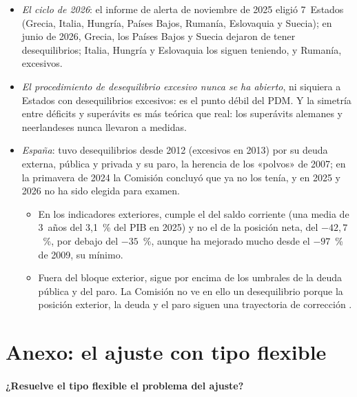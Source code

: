 \documentclass[11pt]{article}
\begin{document}
\begin{itemize}
\item \emph{El ciclo de 2026}: el informe de alerta de noviembre de 2025 eligió 7~Estados (Grecia, Italia, Hungría, Países Bajos, Rumanía, Eslovaquia y Suecia); en junio de 2026, Grecia, los Países Bajos y Suecia dejaron de tener desequilibrios; Italia, Hungría y Eslovaquia los siguen teniendo, y Rumanía, excesivos\nocite{CE2025AMR2026,CE2026PaquetePrimavera}.
\item \emph{El procedimiento de desequilibrio excesivo nunca se ha abierto}, ni siquiera a Estados con desequilibrios excesivos: es el punto débil del PDM. Y la simetría entre déficits y superávits es más teórica que real: los superávits alemanes y neerlandeses nunca llevaron a medidas.
\item \emph{España}: tuvo desequilibrios desde 2012 (excesivos en 2013) por su deuda externa, pública y privada y su paro, la herencia de los «polvos» de 2007; en la primavera de 2024 la Comisión concluyó que ya no los tenía, y en 2025 y 2026 no ha sido elegida para examen\nocite{CE2025PrimaveraPDM}.
  \begin{itemize}
  \item En los indicadores exteriores, cumple el del saldo corriente (una media de 3~años del 3,1~\% del PIB en 2025) y no el de la posición neta, del $-42{,}7$~\%, por debajo del $-35$~\%, aunque ha mejorado mucho desde el $-97$~\% de 2009, su mínimo\nocite{Eurostat2026MIPExterior}.
  \item Fuera del bloque exterior, sigue por encima de los umbrales de la deuda pública y del paro. La Comisión no ve en ello un desequilibrio porque la posición exterior, la deuda y el paro siguen una trayectoria de corrección  .
  \end{itemize}
\end{itemize}

\section{Anexo: el ajuste con tipo flexible}\label{anexo:tipo-flexible}

\paragraph{¿Resuelve el tipo flexible el problema del ajuste?}
\end{document}
